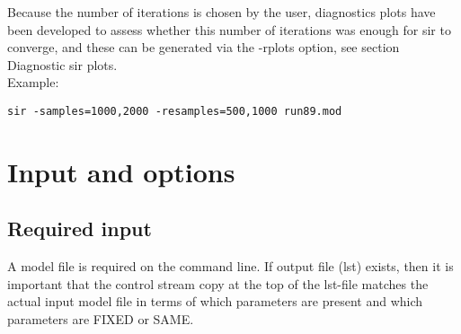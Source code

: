 Because the number of iterations is chosen by the user, diagnostics plots have been developed to assess whether this number of iterations was enough for sir to converge, and these can be generated via the -rplots option, see section Diagnostic sir plots.\\
Example:
\begin{verbatim}
sir -samples=1000,2000 -resamples=500,1000 run89.mod
\end{verbatim}

\section{Input and options}
\subsection{Required input}
A model file is required on the command line. If output file (lst) exists, then it is important that the control stream copy at the top of the lst-file matches the actual input model file in terms of which parameters are present and which parameters are FIXED or SAME.
